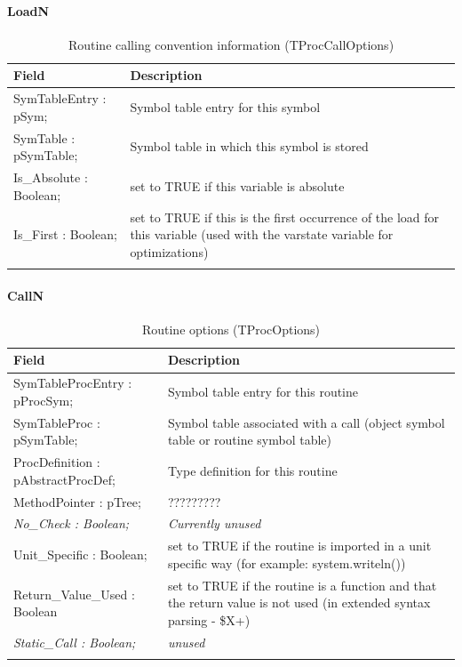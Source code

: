 \documentclass [a4paper,12pt]{article}
\begin{document}
\paragraph{LoadN}\mbox{}

\begin{longtable}{|l|p{10cm}|}
\hline
Field	& Description \\
\hline
\endhead
\hline
\endfoot
\textsf{SymTableEntry : pSym;}&
	Symbol table entry for this symbol \\
\textsf{SymTable : pSymTable;}&
	Symbol table in which this symbol is stored \\
\textsf{Is{\_}Absolute : Boolean;}&
	set to TRUE if this variable is absolute \\
\textsf{Is{\_}First : Boolean;}&
	set to TRUE if this is the first occurrence of the load for this
	variable (used with the varstate variable for optimizations) \\
\hline
\caption{Routine calling convention information (TProcCallOptions)}
\label{tab12}
\end{longtable}

\paragraph{CallN}\mbox{}

\begin{longtable}{|l|p{10cm}|}
\hline
Field	& Description \\
\hline
\endhead
\hline
\endfoot
\textsf{SymTableProcEntry : pProcSym;}&
	Symbol table entry for this routine \\
\textsf{SymTableProc : pSymTable;}&
	Symbol table associated with a call (object symbol table or routine
	symbol table) \\
\textsf{ProcDefinition : pAbstractProcDef;}&
	Type definition for this routine \\
\textsf{MethodPointer : pTree;}&
	????????? \\
\textsf{\textit{No{\_}Check : Boolean;}}&
	\textit{Currently unused} \\
\textsf{Unit{\_}Specific : Boolean;}&
	set to TRUE if the routine is imported in a unit specific way (for
	example: system.writeln()) \\
\textsf{Return{\_}Value{\_}Used : Boolean}&
	set to TRUE if the routine is a function and that the return value
	is not used (in extended syntax parsing - {\$}X+) \\
\textsf{\textit{Static{\_}Call : Boolean;}}&
	\textit{unused} \\
\hline
\caption{Routine options (TProcOptions)}
\label{tab13}
\end{longtable}
\end{document}
